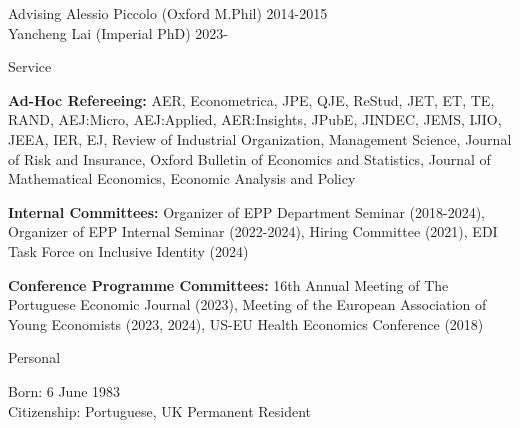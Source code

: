 \documentclass{resume}
\begin{document}
\begin{rSection}{Advising}
	Alessio Piccolo (Oxford M.Phil) \hfill {2014-2015} \\
	Yancheng Lai (Imperial PhD) \hfill {2023-}		
\end{rSection}




\begin{rSection}{Service}

\textbf{Ad-Hoc Refereeing:} AER, Econometrica, JPE, QJE, ReStud, JET, ET, TE, RAND, AEJ:Micro, AEJ:Applied, AER:Insights, 
JPubE, JINDEC, JEMS, IJIO, JEEA, IER, EJ, Review of Industrial Organization, Management Science, 
Journal of Risk and Insurance, Oxford Bulletin of Economics and Statistics, 
Journal of Mathematical Economics, Economic Analysis and Policy


\textbf{Internal Committees:} Organizer of EPP Department Seminar (2018-2024), Organizer of EPP Internal Seminar  (2022-2024), 
Hiring Committee (2021), EDI Task Force on Inclusive Identity (2024)

\textbf{Conference Programme Committees:} 16th Annual Meeting of The Portuguese Economic Journal (2023), 
Meeting of the European Association of Young Economists (2023, 2024), US-EU Health Economics Conference (2018)
	
\end{rSection}




\begin{rSection}{Personal}

Born: 6 June 1983
\\ Citizenship: Portuguese, UK Permanent Resident

\end{rSection}
\end{document}
